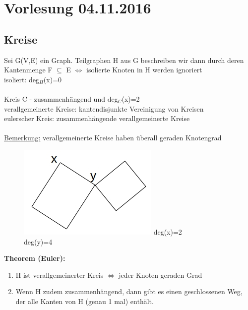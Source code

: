 \section{Vorlesung 04.11.2016}
\subsection{Kreise}
Sei G(V,E) ein Graph. Teilgraphen H aus G beschreiben wir dann durch deren Kantenmenge F $\subseteq$ E $\Leftrightarrow$ isolierte Knoten in H werden ignoriert\\
isoliert: deg$_H$(x)=0
\\\\
Kreis C - zusammenhängend und deg$_C$(x)=2\\
verallgemeinerte Kreise: kantendisjunkte Vereinigung von Kreisen\\
eulerscher Kreis: zusammenhängende verallgemeinerte Kreise\\
\\
\underline{Bemerkung:} verallgemeinerte Kreise haben überall geraden Knotengrad
\begin{figure}[htp]
\centering
\includegraphics[scale=0.75]{lectures/161104/pix/pic1.jpg}
deg(x)=2\\
deg(y)=4
\end{figure}

\textbf{Theorem (Euler):}
\begin{enumerate}
	\item H ist verallgemeinerter Kreis $\Leftrightarrow$ jeder Knoten geraden Grad
	\item Wenn H zudem zusammenhängend, dann gibt es einen geschlossenen Weg, der alle Kanten von H (genau 1 mal) enthält.
\end{enumerate}


